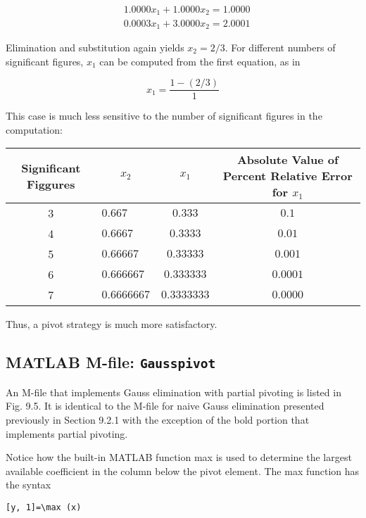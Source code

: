 \documentclass[../main.tex]{subfiles}
\begin{document}
\begin{example}
    $$
    \begin{aligned}
    &1.0000 x_{1}+1.0000 x_{2}=1.0000 \\
    &0.0003 x_{1}+3.0000 x_{2}=2.0001
    \end{aligned}
    $$
    \bigskip

    Elimination and substitution again yields $x_{2}=2 / 3$. For different numbers of significant figures, $x_{1}$ can be computed from the first equation, as in

    $$
    x_{1}=\frac{1-(2 / 3)}{1}
    $$

    This case is much less sensitive to the number of significant figures in the computation:
    \bigskip

    \begin{tabular}{clcc}
    Significant Figgures & \multicolumn{1}{c}{$x_{2}$} & \multicolumn{1}{c}{$x_{1}$} & \multicolumn{1}{c}{ Absolute Value of Percent Relative Error for $x_{1}$} \\
    \hline 3 & $0.667$ & $0.333$ & $0.1$ \\
    4 & $0.6667$ & $0.3333$ & $0.01$ \\
    5 & $0.66667$ & $0.33333$ & $0.001$ \\
    6 & $0.666667$ & $0.333333$ & $0.0001$ \\
    7 & $0.6666667$ & $0.3333333$ & $0.0000$
    \end{tabular}
    \bigskip

    Thus, a pivot strategy is much more satisfactory.

\end{example}

\subsection{MATLAB M-file: \texttt{Gausspivot}}

An M-file that implements Gauss elimination with partial pivoting is listed in Fig. 9.5. It is identical to the M-file for naive Gauss elimination presented previously in Section 9.2.1 with the exception of the bold portion that implements partial pivoting.

Notice how the built-in MATLAB function max is used to determine the largest available coefficient in the column below the pivot element. The max function has the syntax

\begin{lstlisting}[numbers=none,frame=none]
    [y, 1]=\max (x)
\end{lstlisting}
\end{document}
